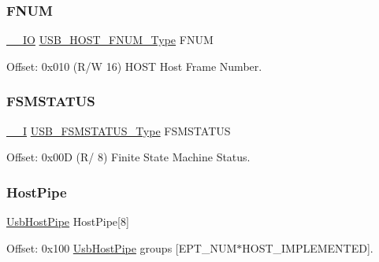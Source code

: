 \mbox{\label{struct_usb_host_ab81f4ba4820ccbeeddd23394d96aa981}} 
\subsubsection{\texorpdfstring{FNUM}{FNUM}}
{\footnotesize\ttfamily \mbox{\hyperlink{core__cm0plus_8h_aec43007d9998a0a0e01faede4133d6be}{\+\_\+\+\_\+\+IO}} \mbox{\hyperlink{union_u_s_b___h_o_s_t___f_n_u_m___type}{U\+S\+B\+\_\+\+H\+O\+S\+T\+\_\+\+F\+N\+U\+M\+\_\+\+Type}} F\+N\+UM}



Offset\+: 0x010 (R/W 16) H\+O\+ST Host Frame Number. 

\mbox{\label{struct_usb_host_a96bd1d241ecd0cfafc7b234d2d76f769}} 
\subsubsection{\texorpdfstring{FSMSTATUS}{FSMSTATUS}}
{\footnotesize\ttfamily \mbox{\hyperlink{core__cm0plus_8h_af63697ed9952cc71e1225efe205f6cd3}{\+\_\+\+\_\+I}} \mbox{\hyperlink{union_u_s_b___f_s_m_s_t_a_t_u_s___type}{U\+S\+B\+\_\+\+F\+S\+M\+S\+T\+A\+T\+U\+S\+\_\+\+Type}} F\+S\+M\+S\+T\+A\+T\+US}



Offset\+: 0x00D (R/ 8) Finite State Machine Status. 

\mbox{\label{struct_usb_host_a922ba18f1b5ccc8f9f8e36166fe874e9}} 
\subsubsection{\texorpdfstring{HostPipe}{HostPipe}}
{\footnotesize\ttfamily \mbox{\hyperlink{struct_usb_host_pipe}{Usb\+Host\+Pipe}} Host\+Pipe\mbox{[}8\mbox{]}}



Offset\+: 0x100 \mbox{\hyperlink{struct_usb_host_pipe}{Usb\+Host\+Pipe}} groups \mbox{[}E\+P\+T\+\_\+\+N\+U\+M$\ast$\+H\+O\+S\+T\+\_\+\+I\+M\+P\+L\+E\+M\+E\+N\+T\+ED\mbox{]}. 

\mbox{\label{struct_usb_host_a275b218a05da429a550ae72e392a570d}} 
